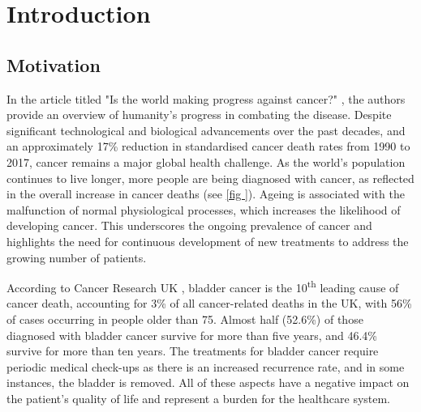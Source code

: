 
\chapter{Introduction}

\vspace{3mm}
\vspace{3mm}


\section{Motivation}


In the article titled "Is the world making progress against cancer?" \citep{Roser2015-qb}, the authors provide an overview of humanity's progress in combating the disease. Despite significant technological and biological advancements over the past decades, and an approximately 17\% reduction in standardised cancer death rates from 1990 to 2017, cancer remains a major global health challenge. As the world’s population continues to live longer, more people are being diagnosed with cancer, as reflected in the overall increase in cancer deaths (see \cref{fig
}). Ageing is associated with the malfunction of normal physiological processes, which increases the likelihood of developing cancer. This underscores the ongoing prevalence of cancer and highlights the need for continuous development of new treatments to address the growing number of patients.


According to Cancer Research UK \citeyearpar{Cancer_Research_UK2015-cf}, bladder cancer is the 10\textsuperscript{th} leading cause of cancer death, accounting for 3\% of all cancer-related deaths in the UK, with 56\% of cases occurring in people older than 75. Almost half (52.6\%) of those diagnosed with bladder cancer survive for more than five years, and 46.4\% survive for more than ten years. The treatments for bladder cancer require periodic medical check-ups as there is an increased recurrence rate, and in some instances, the bladder is removed. All of these aspects have a negative impact on the patient's quality of life and represent a burden for the healthcare system.

